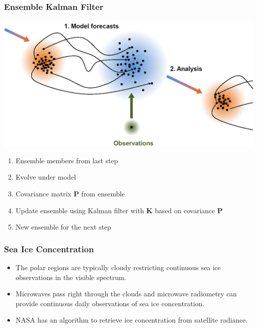\documentclass{beamer}
\newcommand{\mP}{\textbf{P}}
\newcommand{\mK}{\textbf{K}}
\begin{document}
\begin{frame}
\frametitle{Ensemble Kalman Filter}
\begin{center}
\includegraphics[width=0.6\linewidth]{Figures/EnKF.png}
\end{center}

\begin{enumerate}
\item Ensemble members from last step
\item Evolve under model
\item Covariance matrix $\mP$ from ensemble
\item Update ensemble using Kalman filter with $\mK$ based on covariance $\mP$
\item New ensemble for the next step
\end{enumerate}
\end{frame}

\begin{frame}
\frametitle{Sea Ice Concentration}
\begin{itemize}
	\item The polar regions are typically cloudy restricting continuous sea ice observations in the visible spectrum.
	\item Microwaves pass right through the clouds and microwave radiometry can provide continuous daily observations of sea ice concentration.
	\item NASA has an algorithm to retrieve ice concentration from satellite radiance.
\end{itemize}
\end{frame}
\end{document}
